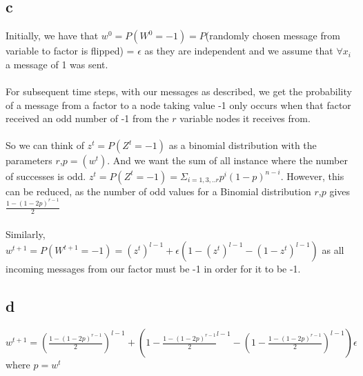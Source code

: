 \documentclass[12pt]{article}
\begin{document}
\begin{section}{5.1}
	\subsection{c}
	Initially, we have that $w^0=  P(W^0=-1) = P$(randomly chosen message from variable to factor is flipped) = $\epsilon$ as they are independent and we assume that $\forall x_i $ a message of 1 was sent.
	\\
	\\
	For subsequent time steps, with our messages as described, we get the probability of a message from a factor to a node taking value -1 only occurs when that factor received an odd number of -1 from the $r$ variable nodes it receives from. 
	\\
	\\
	So we can think of $z^t=P(Z^t=-1)$ as a binomial distribution with the parameters  $r$,$p= (w^{t})$. And we want the sum of all instance where the number of successes is odd.
	$z^t=P(Z^t=-1) = \Sigma_{i=1,3,..r} p^i(1-p)^{n-i}$. However, this can be reduced, as the number of odd values for a Binomial distribution $r$,$p$ gives$\frac{1-(1-2p)^{r-1}}{2}$
	\\
	\\
	Similarly,
	$w^{t+1} = P(W^{t+1}=-1) = (z^t)^{l-1} + \epsilon(1- (z^t)^{l-1} - (1-z^t)^{l-1})$ as all incoming messages from our factor must be -1 in order for it to be -1.
	\subsection{d}
	$w^{t+1} = ( \frac{1-(1-2p)^{r-1}}{2})^{l-1} + (1-\frac{1-(1-2p)^{r-1}}{2}^{l-1} - (1-\frac{1-(1-2p)^{r-1}}{2})^{l-1})\epsilon $ where $p = w^{t}$
	\\
	\\
	

\end{section}
\end{document}
